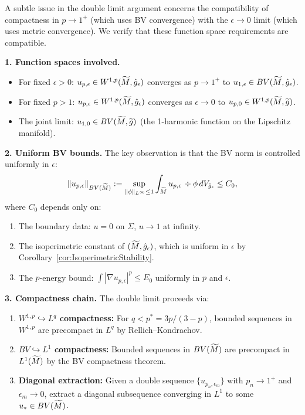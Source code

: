 \begin{remark}\label{rem:BVCompatibility}
A subtle issue in the double limit argument concerns the compatibility of compactness in $p \to 1^+$ (which uses BV convergence) with the $\epsilon \to 0$ limit (which uses metric convergence). We verify that these function space requirements are compatible.

\textbf{1. Function spaces involved.}
\begin{itemize}
    \item For fixed $\epsilon > 0$: $u_{p,\epsilon} \in W^{1,p}(\widetilde{M}, \hat{g}_\epsilon)$ converges as $p \to 1^+$ to $u_{1,\epsilon} \in BV(\widetilde{M}, \hat{g}_\epsilon)$.
    \item For fixed $p > 1$: $u_{p,\epsilon} \in W^{1,p}(\widetilde{M}, \hat{g}_\epsilon)$ converges as $\epsilon \to 0$ to $u_{p,0} \in W^{1,p}(\widetilde{M}, \widetilde{g})$.
    \item The joint limit: $u_{1,0} \in BV(\widetilde{M}, \widetilde{g})$ (the 1-harmonic function on the Lipschitz manifold).
\end{itemize}

\textbf{2. Uniform BV bounds.} The key observation is that the BV norm is controlled uniformly in $\epsilon$:
\begin{equation}
    \|u_{p,\epsilon}\|_{BV(\widetilde{M})} := \sup_{\|\phi\|_{L^\infty} \le 1} \int_{\widetilde{M}} u_{p,\epsilon} \, \div \phi \, dV_{\hat{g}_\epsilon} \le C_0,
\end{equation}
where $C_0$ depends only on:
\begin{enumerate}
    \item The boundary data: $u = 0$ on $\Sigma$, $u \to 1$ at infinity.
    \item The isoperimetric constant of $(\widetilde{M}, \hat{g}_\epsilon)$, which is uniform in $\epsilon$ by Corollary~\ref{cor:IsoperimetricStability}.
    \item The $p$-energy bound: $\int |\nabla u_{p,\epsilon}|^p \le E_0$ uniformly in $p$ and $\epsilon$.
\end{enumerate}

\textbf{3. Compactness chain.} The double limit proceeds via:
\begin{enumerate}
    \item \textbf{$W^{1,p} \hookrightarrow L^q$ compactness:} For $q < p^* = 3p/(3-p)$, bounded sequences in $W^{1,p}$ are precompact in $L^q$ by Rellich--Kondrachov.
    \item \textbf{$BV \hookrightarrow L^1$ compactness:} Bounded sequences in $BV(\widetilde{M})$ are precompact in $L^1(\widetilde{M})$ by the BV compactness theorem.
    \item \textbf{Diagonal extraction:} Given a double sequence $\{u_{p_n, \epsilon_m}\}$ with $p_n \to 1^+$ and $\epsilon_m \to 0$, extract a diagonal subsequence converging in $L^1$ to some $u_* \in BV(\widetilde{M})$.
\end{enumerate}


\end{remark}
